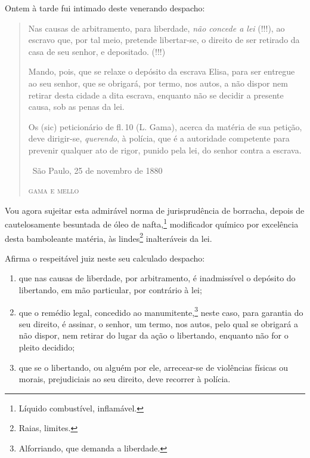 {Ontem à tarde fui intimado deste venerando despacho:

\begin{quote}
Nas causas de arbitramento, para liberdade, \emph{não concede a lei}
(!!!), ao escravo que, por tal meio, pretende libertar-se, o direito de
ser retirado da casa de seu senhor, e depositado. (!!!)

Mando, pois, que se relaxe o depósito da escrava Elisa, para ser
entregue ao seu senhor, que se obrigará, por termo, nos autos, a não
dispor nem retirar desta cidade a dita escrava, enquanto não se decidir
a presente causa, sob as penas da lei.

Os (sic) peticionário de fl.\,10 (L. Gama), acerca da matéria de sua
petição, deve dirigir-se, \emph{querendo}, à polícia, que é a autoridade
competente para prevenir qualquer ato de rigor, punido pela lei, do
senhor contra a escrava.

\medskip

\hfill\ São Paulo, 25 de novembro de 1880

\hfill\textsc{gama e mello}
\end{quote}

\asterisc

Vou agora sujeitar esta admirável norma de jurisprudência de borracha,
depois de cautelosamente besuntada de óleo de nafta,\footnote{Líquido
  combustível, inflamável.} modificador químico por excelência desta
bamboleante matéria, às lindes\footnote{Raias, limites.} inalteráveis
da lei.

Afirma o respeitável juiz neste seu calculado despacho:

\begin{enumerate}[label=\arabic*º]
\item que nas causas de liberdade, por arbitramento, é inadmissível
o depósito do libertando, em mão particular, por contrário à lei;

\item que o remédio legal, concedido ao manumitente,\footnote{
  Alforriando, que demanda a liberdade.} neste caso, para garantia do
seu direito, é assinar, o senhor, um termo, nos autos, pelo qual se
obrigará a não dispor, nem retirar do lugar da ação o libertando,
enquanto não for o pleito decidido;

\item que se o libertando, ou alguém por ele, arrecear-se de
violências físicas ou morais, prejudiciais ao seu direito, deve recorrer
à polícia.
\end{enumerate}

}

